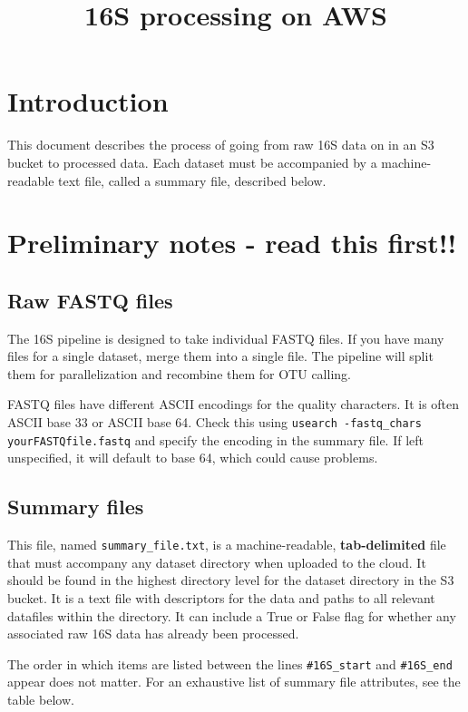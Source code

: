 \documentclass[11pt, oneside]{article}   	%
\title{16S processing on AWS}
\date{}							%
\begin{document}
\maketitle
\section{Introduction}
This document describes the process of going from raw 16S data on in an S3 bucket to processed data.  Each dataset must be accompanied by a machine-readable text file, called a summary file, described below. 

\section{Preliminary notes - read this first!!}
\subsection{Raw FASTQ files}
The 16S pipeline is designed to take individual FASTQ files.  If you have many files for a single dataset, merge them into a single file.  The pipeline will split them for parallelization and recombine them for OTU calling.

FASTQ files have different ASCII encodings for the quality characters.  It is often ASCII base 33 or ASCII base 64.  Check this using {\tt usearch -fastq\_chars yourFASTQfile.fastq} and specify the encoding in the summary file.  If left unspecified, it will default to base 64, which could cause problems.

\subsection{Summary files}
This file, named {\tt summary\_file.txt}, is a machine-readable, \textbf{tab-delimited} file that must accompany any dataset directory when uploaded to the cloud.  It should be found in the highest directory level for the dataset directory in the S3 bucket.  It is a text file with descriptors for the data and paths to all relevant datafiles within the directory.  It can include a True or False flag for whether any associated raw 16S data has already been processed.  

The order in which items are listed between the lines {\tt \#16S\_start} and {\tt \#16S\_end} appear does not matter.  For an exhaustive list of summary file attributes, see the table below.
\end{document}
